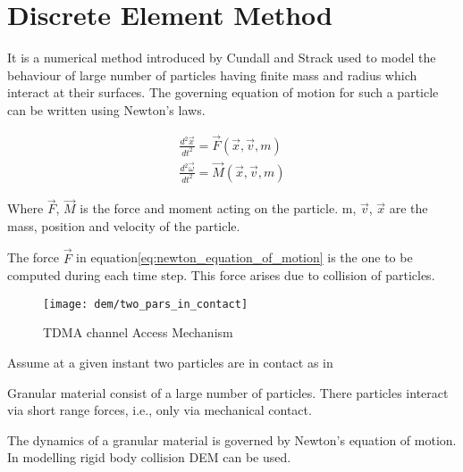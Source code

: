 \chapter{Discrete Element Method}

It is a numerical method introduced by Cundall and Strack \citep{CS79}
used to model the behaviour of large number of particles having finite
mass and radius which interact at their surfaces. The governing
equation of motion for such a particle can be written using Newton's
laws.

\begin{align}
  \label{eq:newton_equation_of_motion}
  \frac{d^2 \vec{x}}{dt^2} = \vec{F}(\vec{x}, \vec{v}, m)\\
  \frac{d^2 \vec{\omega}}{dt^2} = \vec{M}(\vec{x}, \vec{v}, m)
\end{align}


Where $\vec{F}$, $\vec{M}$ is the force and moment acting on the
particle. m, $\vec{v}$, $\vec{x}$ are the mass, position and velocity
of the particle.

The force $\vec{F}$ in equation\ref{eq:newton_equation_of_motion} is
the one to be computed during each time step. This force arises due to
collision of particles.

\begin{figure}[!h]
\begin{center}
\texttt{[image: dem/two\_pars\_in\_contact]}
\caption{TDMA channel Access Mechanism} \label{fig:tdma}
\end{center}
\end{figure}


Assume at a given instant two particles are in contact as in


Granular material consist of a large number of particles. There particles interact
via short range forces, i.e., only via mechanical contact.

The dynamics of a granular material is governed by Newton's equation of motion.
In modelling rigid body collision DEM can be used.



